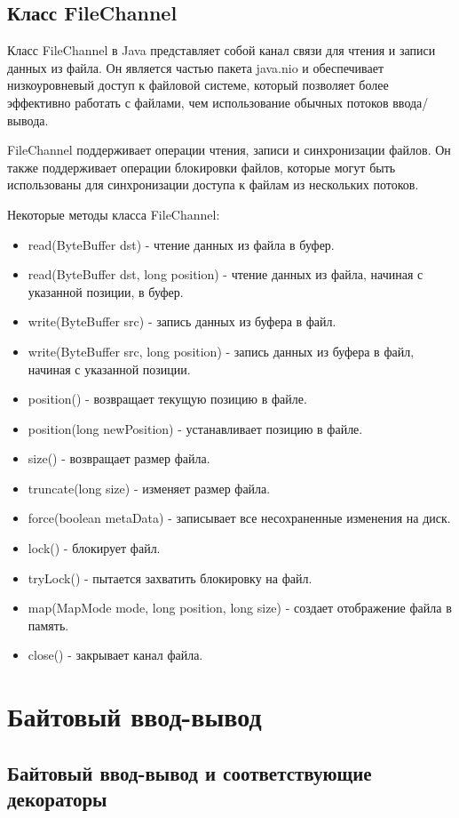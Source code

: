 \section{Класс FileChannel}

Класс FileChannel в Java представляет собой канал связи для чтения и записи данных из файла. Он является частью пакета java.nio и обеспечивает низкоуровневый доступ к файловой системе, который позволяет более эффективно работать с файлами, чем использование обычных потоков ввода/вывода.

FileChannel поддерживает операции чтения, записи и синхронизации файлов. Он также поддерживает операции блокировки файлов, которые могут быть использованы для синхронизации доступа к файлам из нескольких потоков.

Некоторые методы класса FileChannel:

\begin{itemize}
\item read(ByteBuffer dst) - чтение данных из файла в буфер.
\item read(ByteBuffer dst, long position) - чтение данных из файла, начиная с указанной позиции, в буфер.
\item write(ByteBuffer src) - запись данных из буфера в файл.
\item write(ByteBuffer src, long position) - запись данных из буфера в файл, начиная с указанной позиции.
\item position() - возвращает текущую позицию в файле.
\item position(long newPosition) - устанавливает позицию в файле.
\item size() - возвращает размер файла.
\item truncate(long size) - изменяет размер файла.
\item force(boolean metaData) - записывает все несохраненные изменения на диск.
\item lock() - блокирует файл.
\item tryLock() - пытается захватить блокировку на файл.
\item map(MapMode mode, long position, long size) - создает отображение файла в память.
\item close() - закрывает канал файла.
\end{itemize}

\chapter{Байтовый ввод-вывод}
\section{Байтовый ввод-вывод и соответствующие декораторы}

